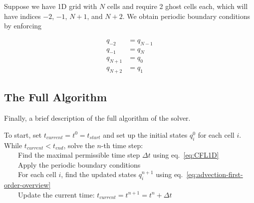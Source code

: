 Suppose we have 1D grid with $N$ cells and require 2 ghost cells each, which will have indices $-2$, $-1$, $N+1$, and $N+2$.
We obtain periodic boundary conditions by enforcing

\begin{align*}
	q_{-2} &= q_{N-1} \\
	q_{-1} &= q_{N}	\\
	q_{N+1} &= q_0 	\\
	q_{N+2} &= q_1
\end{align*}





\subsection{The Full Algorithm}

Finally, a brief description of the full algorithm of the solver.

To start, set $t_{current} = t^0 = t_{start}$ and set up the initial states $q_i^0$ for
each cell $i$.\\[.5em]
%
While $t_{current} < t_{end}$, solve the $n$-th time step:\\[.5em]
%
\indent~~~~Find the maximal permissible time step $\Delta t$ using eq.~\ref{eq:CFL1D} \\[.5em]
%
\indent~~~~Apply the periodic boundary conditions \\[.5em]
%
\indent~~~~For each cell $i$, find the updated states $q_i^{n+1}$ using
eq.~\ref{eq:advection-first-order-overview} \\[.5em]
%
\indent~~~~Update the current time: $t_{current} = t^{n+1} = t^n + \Delta t$


